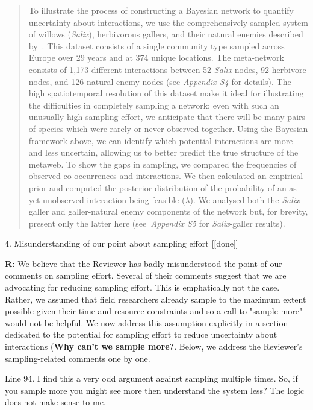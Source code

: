 \documentclass[12pt]{letter}
\newenvironment{refquote}{\bigskip \begin{it}}{\end{it}\smallskip}
\begin{document}
		\begin{quotation}

 			To illustrate the process of constructing a Bayesian network to quantify uncertainty about interactions, we use the comprehensively-sampled system of willows (\emph{Salix}), herbivorous gallers, and their natural enemies described by~\citet{Kopelke2017}. This dataset consists of a single community type sampled across Europe over 29 years and at 374 unique locations. The meta-network consists of 1,173 different interactions between 52 \emph{Salix} nodes, 92 herbivore nodes, and 126 natural enemy nodes (see \emph{Appendix S4} for details). 
      The high spatiotemporal resolution of this dataset make it ideal for illustrating the difficulties in completely sampling a network; even with such an unusually high sampling effort, we anticipate that there will be many pairs of species which were rarely or never observed together. Using the Bayesian framework above, we can identify which potential interactions are more and less uncertain, allowing us to better predict the true structure of the metaweb. To show the gaps in sampling, we compared the frequencies of observed co-occurrences and interactions. We then calculated an empirical prior and computed the posterior distribution of the probability of an as-yet-unobserved interaction being feasible ($\lambda$).
      We analysed both the \emph{Salix}-galler and galler-natural enemy components of the network but, for brevity, present only the latter here (see~\emph{Appendix S5} for \emph{Salix}-galler results).

		\end{quotation}


	4. Misunderstanding of our point about sampling effort [[done]]

		\textbf{R:} We believe that the Reviewer has badly misunderstood the point of our comments on sampling effort. Several of their comments suggest that we are advocating for reducing sampling effort. This is emphatically not the case. Rather, we assumed that field researchers already sample to the maximum extent possible given their time and resource constraints and so a call to "sample more" would not be helpful. We now address this assumption explicitly in a section dedicated to the potential for sampling effort to reduce uncertainty about interactions (\textbf{Why can't we sample more?}. Below, we address the Reviewer's sampling-related comments one by one.


		\begin{refquote}
		Line 94.  I find this a very odd argument against sampling multiple times.  So, if you sample more you might see more then understand the system less?  The logic does not make sense to me. 
		\end{refquote}
\end{document}
